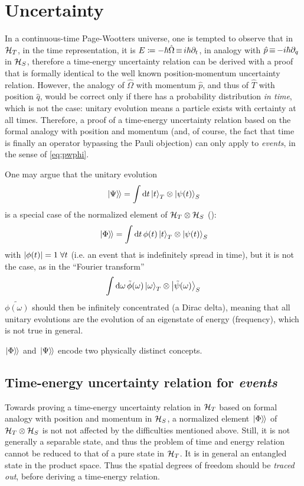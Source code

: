 \section{Uncertainty}

In a continuous-time Page-Wootters universe,
one is tempted to observe that in $\mathcal{H}_T$,
in the time representation, it is $E \coloneqq -\hbar\hat{\Omega} \operatorname*{\equiv} i\hbar\partial_{t}$,
in analogy with $\hat{p} \operatorname*{\equiv} -i\hbar\partial_{q}$ in $\mathcal{H}_S$,
therefore a time-energy uncertainty relation can be derived
with a proof that is formally identical to the well known
position-momentum uncertainty relation. However, the analogy of
$\hat{\Omega}$ with momentum $\hat{p}$,
and thus of $\hat{T}$ with position $\hat{q}$,
would be correct only if there has a probability distribution \emph{in time},
which is not the case: unitary evolution means a particle exists with
certainty at all times. Therefore, a proof of a time-energy uncertainty
relation based on the formal analogy with position and momentum
(and, of course, the fact that time is finally an operator bypassing the Pauli objection)
can only apply to \emph{events}, in the sense of \eqref{eq:pwphi}.

One may argue that the unitary evolution
\[
  \left.\left| \Psi \right\rangle\hspace{-0.115em}\right\rangle = \int \dd{t} \ket{t}_T \otimes \ket{\psi(t)}_S
\]
is a special case of the normalized element of $\mathcal{H}_T\otimes\mathcal{H}_S$ ():
\[
  \left.\left| \Phi \right\rangle\hspace{-0.115em}\right\rangle = \int \dd{t} \phi(t) \ket{t}_T \otimes \ket{\psi(t)}_S
\]
with $\abs{\phi(t)}=1 \; \forall t$ (i.e. an event that is indefinitely spread in time),
but it is not the case, as in the ``Fourier transform''
\[
  \int \dd \omega \, \tilde{\phi}(\omega) \ket{\omega}_T \otimes \ket{\tilde{\psi}(\omega)}_S
\]
$\tilde{\phi(\omega)}$ should then be infinitely concentrated (a Dirac delta),
meaning that all unitary evolutions are the evolution of an eigenstate of energy (frequency),
which is not true in general.

$\left.\left| \Phi \right\rangle\hspace{-0.115em}\right\rangle$ and $\left.\left| \Psi \right\rangle\hspace{-0.115em}\right\rangle$ encode two physically distinct concepts.

\subsection{Time-energy uncertainty relation for \emph{events}}
Towards proving a time-energy uncertainty relation in $\mathcal{H}_T$
based on formal analogy with position and momentum in $\mathcal{H}_S$,
a normalized element $\left.\left| \Phi \right\rangle\hspace{-0.115em}\right\rangle$ of $\mathcal{H}_T\otimes\mathcal{H}_S$ 
is not not affected by the difficulties mentioned above.
Still, it is not generally
a separable state,
and thus
the problem of time and energy relation cannot be reduced to that of
a pure state in $\mathcal{H}_T$.
It is in general an entangled state in the product space.
Thus the spatial degrees of freedom should be \emph{traced out},
before deriving a time-energy relation.

